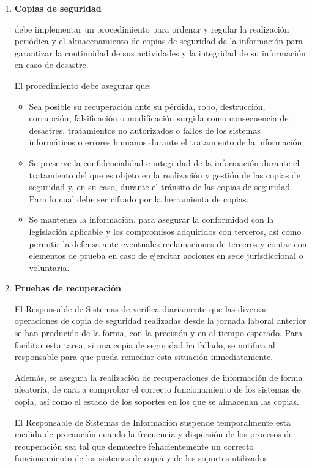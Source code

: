\begin{enumerate}[label=\alph*)]

\item \textbf{Copias de seguridad}

\Beneficiario{} debe implementar un procedimiento para ordenar y regular la realización periódica y el almacenamiento de copias de seguridad de la información para garantizar la continuidad de sus actividades y la integridad de su información en caso de desastre.

El procedimiento debe asegurar que:

\begin{itemize}
    \item Sea posible su recuperación ante su pérdida, robo, destrucción, corrupción, falsificación o modificación surgida como consecuencia de desastres, tratamientos no autorizados o fallos de los sistemas informáticos o errores humanos durante el tratamiento de la información.
    \item Se preserve la confidencialidad e integridad de la información durante el tratamiento del que es objeto en la realización y gestión de las copias de seguridad y, en su caso, durante el tránsito de las copias de seguridad. Para lo cual debe ser cifrado por la herramienta de copias.
    \item Se mantenga la información, para asegurar la conformidad con la legislación aplicable y los compromisos adquiridos con terceros, así como permitir la defensa ante eventuales reclamaciones de terceros y contar con elementos de prueba en caso de ejercitar acciones en sede jurisdiccional o voluntaria.
\end{itemize}

\item \textbf{Pruebas de recuperación}

El Responsable de Sistemas de \Beneficiario{} verifica diariamente que las diversas operaciones de copia de seguridad realizadas desde la jornada laboral anterior se han producido de la forma, con la precisión y en el tiempo esperado. Para facilitar esta tarea, si una copia de seguridad ha fallado, se notifica al responsable para que pueda remediar esta situación inmediatamente.

Además, se asegura la realización de recuperaciones de información de forma aleatoria, de cara a comprobar el correcto funcionamiento de los sistemas de copia, así como el estado de los soportes en los que se almacenan las copias.

El Responsable de Sistemas de Información suspende temporalmente esta medida de precaución cuando la frecuencia y dispersión de los procesos de recuperación sea tal que demuestre fehacientemente un correcto funcionamiento de los sistemas de copia y de los soportes utilizados.


\end{enumerate}
